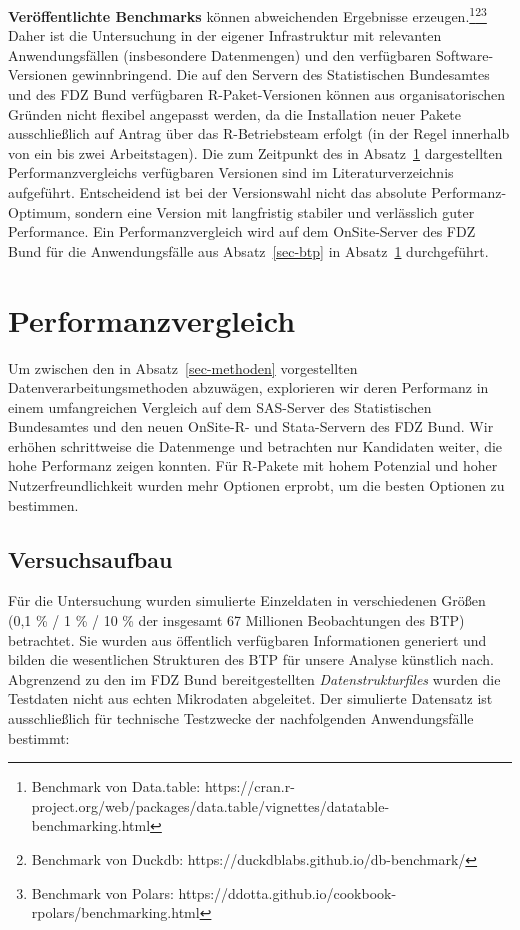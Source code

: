 \documentclass[
  german,
  10pt,
  twoside]{article}
\let\oldtextbf\textbf
\renewcommand{\textbf}[1]{{\color{wistaBlue}\oldtextbf{#1}}}
\let\oldref\ref
\renewcommand{\ref}[1]{\oldref{#1}\raisebox{-0.2ex}{\scriptsize\color{wistaBlue}\ding{247}}}
\begin{document}
\textbf{Veröffentlichte Benchmarks} können abweichenden Ergebnisse
erzeugen.\footnote{Benchmark von Data.table:
  https://cran.r-project.org/web/packages/data.table/vignettes/datatable-benchmarking.html}\footnote{Benchmark
  von Duckdb: https://duckdblabs.github.io/db-benchmark/}\footnote{Benchmark
  von Polars:
  https://ddotta.github.io/cookbook-rpolars/benchmarking.html} Daher ist
die Untersuchung in der eigener Infrastruktur mit relevanten
Anwendungsfällen (insbesondere Datenmengen) und den verfügbaren
Software-Versionen gewinnbringend. Die auf den Servern des Statistischen
Bundesamtes und des FDZ Bund verfügbaren R-Paket-Versionen können aus
organisatorischen Gründen nicht flexibel angepasst werden, da die
Installation neuer Pakete ausschließlich auf Antrag über das
R-Betriebsteam erfolgt (in der Regel innerhalb von ein bis zwei
Arbeitstagen). Die zum Zeitpunkt des in Absatz~\ref{sec-benchmark}
dargestellten Performanzvergleichs verfügbaren Versionen sind im
Literaturverzeichnis aufgeführt. Entscheidend ist bei der Versionswahl
nicht das absolute Performanz-Optimum, sondern eine Version mit
langfristig stabiler und verlässlich guter Performance. Ein
Performanzvergleich wird auf dem OnSite-Server des FDZ Bund für die
Anwendungsfälle aus Absatz~\ref{sec-btp} in Absatz~\ref{sec-benchmark}
durchgeführt.

\section{Performanzvergleich}\label{sec-benchmark}

Um zwischen den in Absatz~\ref{sec-methoden} vorgestellten
Datenverarbeitungsmethoden abzuwägen, explorieren wir deren Performanz
in einem umfangreichen Vergleich auf dem SAS-Server des Statistischen
Bundesamtes und den neuen OnSite-R- und Stata-Servern des FDZ Bund. Wir
erhöhen schrittweise die Datenmenge und betrachten nur Kandidaten
weiter, die hohe Performanz zeigen konnten. Für R-Pakete mit hohem
Potenzial und hoher Nutzerfreundlichkeit wurden mehr Optionen erprobt,
um die besten Optionen zu bestimmen.

\subsection{Versuchsaufbau}\label{versuchsaufbau}

Für die Untersuchung wurden simulierte Einzeldaten in verschiedenen
Größen (0,1 \% / 1 \% / 10 \% der insgesamt 67 Millionen Beobachtungen
des BTP) betrachtet. Sie wurden aus öffentlich verfügbaren Informationen
generiert und bilden die wesentlichen Strukturen des BTP für unsere
Analyse künstlich nach. Abgrenzend zu den im FDZ Bund bereitgestellten
\emph{Datenstrukturfiles} wurden die Testdaten nicht aus echten
Mikrodaten abgeleitet. Der simulierte Datensatz ist ausschließlich für
technische Testzwecke der nachfolgenden Anwendungsfälle bestimmt:
\end{document}
